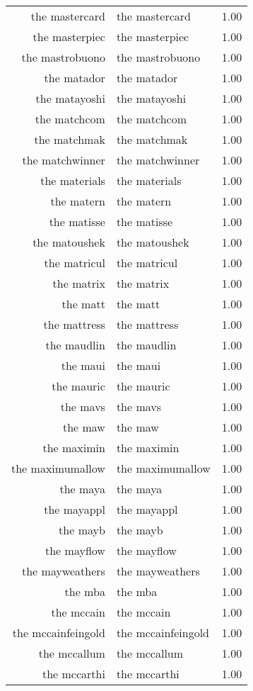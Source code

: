 \begin{table}[ht]
\begin{tabular}{rlr}
  the mastercard & the mastercard & 1.00 \\ 
  the masterpiec & the masterpiec & 1.00 \\ 
  the mastrobuono & the mastrobuono & 1.00 \\ 
  the matador & the matador & 1.00 \\ 
  the matayoshi & the matayoshi & 1.00 \\ 
  the matchcom & the matchcom & 1.00 \\ 
  the matchmak & the matchmak & 1.00 \\ 
  the matchwinner & the matchwinner & 1.00 \\ 
  the materials & the materials & 1.00 \\ 
  the matern & the matern & 1.00 \\ 
  the matisse & the matisse & 1.00 \\ 
  the matoushek & the matoushek & 1.00 \\ 
  the matricul & the matricul & 1.00 \\ 
  the matrix & the matrix & 1.00 \\ 
  the matt & the matt & 1.00 \\ 
  the mattress & the mattress & 1.00 \\ 
  the maudlin & the maudlin & 1.00 \\ 
  the maui & the maui & 1.00 \\ 
  the mauric & the mauric & 1.00 \\ 
  the mavs & the mavs & 1.00 \\ 
  the maw & the maw & 1.00 \\ 
  the maximin & the maximin & 1.00 \\ 
  the maximumallow & the maximumallow & 1.00 \\ 
  the maya & the maya & 1.00 \\ 
  the mayappl & the mayappl & 1.00 \\ 
  the mayb & the mayb & 1.00 \\ 
  the mayflow & the mayflow & 1.00 \\ 
  the mayweathers & the mayweathers & 1.00 \\ 
  the mba & the mba & 1.00 \\ 
  the mccain & the mccain & 1.00 \\ 
  the mccainfeingold & the mccainfeingold & 1.00 \\ 
  the mccallum & the mccallum & 1.00 \\ 
  the mccarthi & the mccarthi & 1.00 \\ 

\end{tabular}
\end{table}
